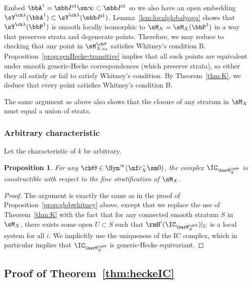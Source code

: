 \documentclass[final]{amsart}
\newtheorem{prop}[subsubsection]{Proposition}
\theoremstyle{remark}
\theoremstyle{definition}
\numberwithin{equation}{section}
\begin{document}
Embed $\bbA^1 = \mbb P^1 \sm \infty \subset \mbb P^1$ so we 
also have an open embedding $\sY^{\ch\lambda}(\bbA^1) \subset \sY^{\ch\lambda}(\mbb P^1)$. 
Lemma~\ref{lem:localglobalyoga} shows that $\sY^{\ch\lambda}(\bbP^1)$ 
is smooth locally isomorphic to $\sM_X=\sM_X(\bbP^1)$ in a way that preserves strata 
and degenerate points. Therefore, we may reduce to checking
that any point in $\sM_{X,v_0}^{\ch\theta}$ satisfies Whitney's condition B.
Proposition~\ref{prop:genHecke-transitive} implies that
all such points are equivalent under smooth generic-Hecke correspondences 
(which preserve strata), so either they all satisfy or fail to satisfy
Whitney's condition. By Theorem~\ref{thm:K}, we deduce that every
point satisfies Whitney's condition B.

\medskip

The same argument as above also shows that the closure of any stratum in $\sM_X$
must equal a union of strata. 

\subsubsection{Arbitrary characteristic} 

Let the characteristic of $k$ be arbitrary. 

\begin{prop} \label{prop:Whitney-poschar}
For any $\ch\Theta \in \Sym^\infty(\mf c_X^-\sm 0)$,
the complex $\IC_{\barM^{\ch\Theta}_X}$ 
is constructible with respect to the fine stratification of $\sM_X$.
\end{prop}

\begin{proof}
The argument is exactly the same as in the proof of Proposition~\ref{prop:globwhitney} 
above, except that we replace the use of Theorem~\ref{thm:K} with
the fact that for any connected smooth stratum $S$ in $\sM_X$, 
there exists some open $U\subset S$ such that 
$\rmH^i(\IC_{\barM^{\ch\Theta}_X})|_U$ is a local system for all $i$.
We implicitly use the uniqueness of the IC complex, which in
particular implies that $\IC_{\barM^{\ch\Theta}_X}$ is generic-Hecke equivariant.
\end{proof}


\subsection{Proof of Theorem~\ref{thm:heckeIC}} \label{sect:pf:heckeIC}
\end{document}
